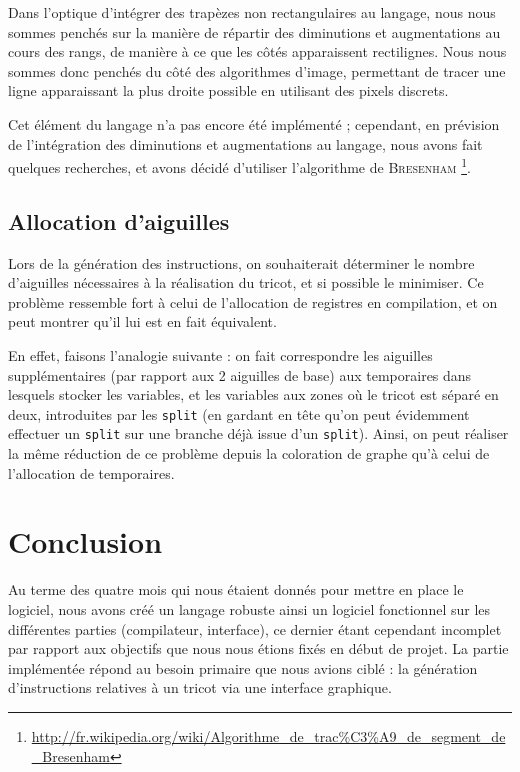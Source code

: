 \documentclass{article}
\begin{document}
Dans l'optique d'intégrer des trapèzes non rectangulaires au langage, nous nous sommes penchés sur la manière de répartir des 
diminutions et augmentations au cours des rangs, de manière à ce que les côtés apparaissent rectilignes.
Nous nous sommes donc penchés du côté des algorithmes d'image, permettant de tracer une ligne apparaissant la plus droite 
possible en utilisant des pixels discrets.

Cet élément du langage n'a pas encore été implémenté ; cependant, en prévision de l'intégration des diminutions et augmentations 
au langage, nous avons fait quelques recherches, et avons décidé d'utiliser l'algorithme de \textsc{Bresenham}
\footnote{\url{http://fr.wikipedia.org/wiki/Algorithme_de_trac\%C3\%A9_de_segment_de_Bresenham}}.

\subsection{Allocation d'aiguilles}

Lors de la génération des instructions, on souhaiterait déterminer le nombre d'aiguilles nécessaires à la réalisation du tricot, 
et si possible le minimiser. Ce problème ressemble fort à celui de l'allocation de registres en compilation, et on peut montrer 
qu'il lui est en fait équivalent.

En effet, faisons l'analogie suivante : on fait correspondre les aiguilles supplémentaires (par rapport aux 2 aiguilles de base) 
aux temporaires dans lesquels stocker les variables, et les variables aux zones où le tricot est séparé en deux, introduites par 
les \texttt{split} (en gardant en tête qu'on peut évidemment effectuer un \texttt{split} sur une branche déjà issue d'un 
\texttt{split}). Ainsi, on peut réaliser la même réduction de ce problème depuis la coloration de graphe qu'à celui de l'allocation 
de temporaires.

\section*{Conclusion}

Au terme des quatre mois qui nous étaient donnés pour mettre en place le logiciel, nous avons créé un langage robuste ainsi un 
logiciel fonctionnel sur les différentes parties (compilateur, interface), ce dernier étant cependant incomplet par rapport aux 
objectifs que nous nous étions fixés en début de projet. La partie implémentée répond au besoin primaire que nous avions ciblé : 
la génération d'instructions relatives à un tricot via une interface graphique.
\end{document}
